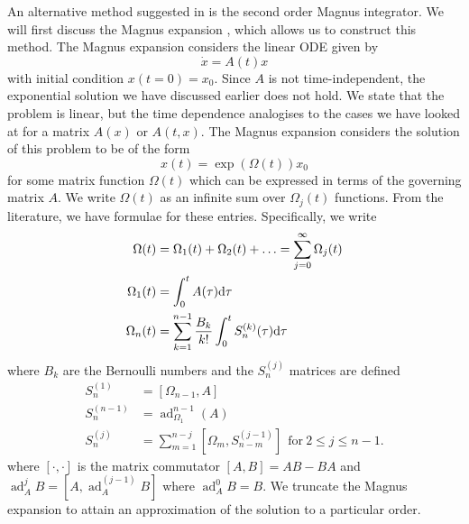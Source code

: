 An alternative method suggested in \cite{blanes_pos_2022} is the second order Magnus integrator.
We will first discuss the Magnus expansion \cite{Magnus_1954, blanesmagnus2009}, which allows us to construct this method.
The Magnus expansion considers the linear ODE given by
\begin{equation*}
    \dot{x} = A(t)x
\end{equation*}
with initial condition $x(t=0) = x_0$.
Since $A$ is not time-independent, the exponential solution we have discussed earlier does not hold.
We state that the problem is linear, but the time dependence analogises to the cases we have looked at for a matrix $A(x)$ or $A(t,x)$.
The Magnus expansion considers the solution of this problem to be of the form
\begin{equation*}
    x(t) = \exp(\Omega(t))x_0
\end{equation*}
for some matrix function $\Omega(t)$ which can be expressed in terms of the governing matrix $A$.
We write $\Omega(t)$ as an infinite sum over $\Omega_j(t)$ functions.
From the literature, we have formulae for these entries.
Specifically, we write
\begin{equation*}
    \begin{aligned}
        \Omega(t) &= \Omega_1(t) + \Omega_2(t) + \mathellipsis = \sum_{j = 0}^{\infty} \Omega_j (t) \\
        \Omega_1(t) &= \int_{0}^{t} A(\tau) \mathrm{d}\tau \\
        \Omega_n(t) &= \sum_{k=1}^{n-1} \frac{B_k}{k!} \int_{0}^{t} S_n^{(k)}(\tau) \mathrm{d}\tau \\
    \end{aligned}
\end{equation*}
where $B_k$ are the Bernoulli numbers \cite{bernoulli} and the $S_n^{(j)}$ matrices are defined
\begin{equation*}
    \begin{aligned}
        S_n^{(1)} &= [\Omega_{n-1}, A] \\
        S_n^{(n-1)} &= \operatorname{ad}_{\Omega_1}^{n-1}(A) \\
        S_n^{(j)} &= \sum_{m=1}^{n-j} \left[ \Omega_m, S_{n-m}^{(j-1)} \right] ~~ \text{for}~ 2 \le j \le n-1.
    \end{aligned} 
\end{equation*}
where $\left[\cdot, \cdot\right]$ is the matrix commutator $[A,B] = AB-BA$ and $\operatorname{ad}_A^{j} B = [ A, \operatorname{ad}_A^{(j-1)}B ]$ where $\operatorname{ad}_A^0 B = B$.
We truncate the Magnus expansion to attain an approximation of the solution to a particular order.
